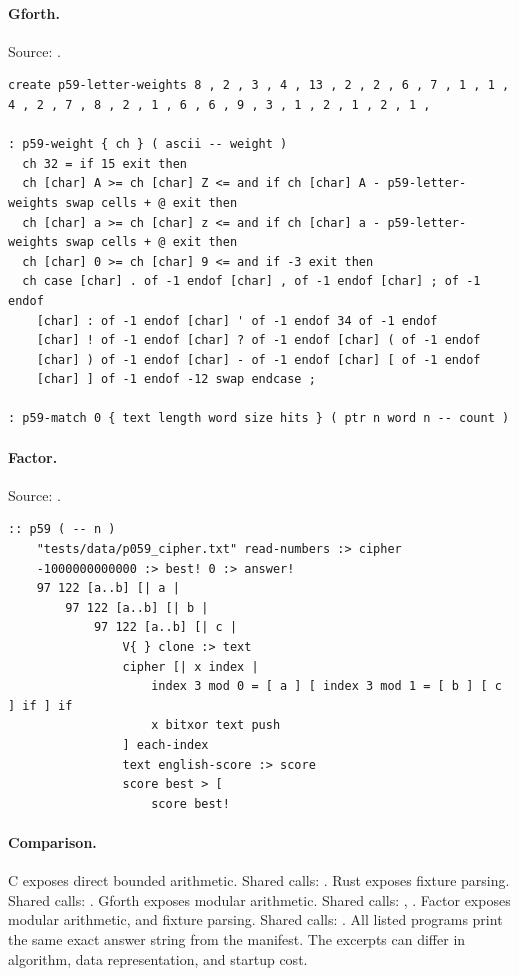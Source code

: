 \paragraph{Gforth.} Source: .
\begin{lstlisting}
create p59-letter-weights 8 , 2 , 3 , 4 , 13 , 2 , 2 , 6 , 7 , 1 , 1 , 4 , 2 , 7 , 8 , 2 , 1 , 6 , 6 , 9 , 3 , 1 , 2 , 1 , 2 , 1 ,

: p59-weight { ch } ( ascii -- weight )
  ch 32 = if 15 exit then
  ch [char] A >= ch [char] Z <= and if ch [char] A - p59-letter-weights swap cells + @ exit then
  ch [char] a >= ch [char] z <= and if ch [char] a - p59-letter-weights swap cells + @ exit then
  ch [char] 0 >= ch [char] 9 <= and if -3 exit then
  ch case [char] . of -1 endof [char] , of -1 endof [char] ; of -1 endof
    [char] : of -1 endof [char] ' of -1 endof 34 of -1 endof
    [char] ! of -1 endof [char] ? of -1 endof [char] ( of -1 endof
    [char] ) of -1 endof [char] - of -1 endof [char] [ of -1 endof
    [char] ] of -1 endof -12 swap endcase ;

: p59-match 0 { text length word size hits } ( ptr n word n -- count )
\end{lstlisting}

\paragraph{Factor.} Source: .
\begin{lstlisting}
:: p59 ( -- n )
    "tests/data/p059_cipher.txt" read-numbers :> cipher
    -1000000000000 :> best! 0 :> answer!
    97 122 [a..b] [| a |
        97 122 [a..b] [| b |
            97 122 [a..b] [| c |
                V{ } clone :> text
                cipher [| x index |
                    index 3 mod 0 = [ a ] [ index 3 mod 1 = [ b ] [ c ] if ] if
                    x bitxor text push
                ] each-index
                text english-score :> score
                score best > [
                    score best!
\end{lstlisting}

\paragraph{Comparison.}
C exposes direct bounded arithmetic. Shared calls: \texttt{}. Rust exposes fixture parsing. Shared calls: \texttt{}. Gforth exposes modular arithmetic. Shared calls: \texttt{}, \texttt{}. Factor exposes modular arithmetic, and fixture parsing. Shared calls: \texttt{}.
All listed programs print the same exact answer string from the manifest. The excerpts can differ in algorithm, data representation, and startup cost.

